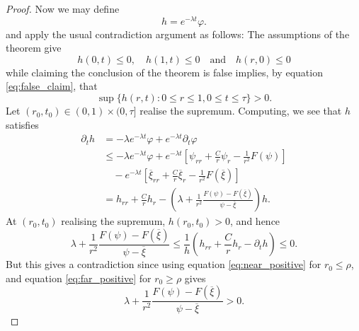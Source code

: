 \documentclass{amsart}
\begin{document}
\begin{proof}
Now we may define
\[
h = e^{-\lambda t} \varphi.
\]
and apply the usual contradiction argument as follows: The assumptions of the theorem give
\[
h(0, t) \leq 0, \quad h(1, t) \leq 0 \quad \text{and} \quad h(r, 0) \leq 0
\]
while claiming the conclusion of the theorem is false implies, by equation \eqref{eq:false_claim}, that
\[
\sup \{h(r, t) : 0 \leq r \leq 1, 0 \leq t \leq \tau\} > 0.
\]
Let \((r_0, t_0) \in (0, 1) \times (0, \tau]\) realise the supremum. Computing, we see that \(h\) satisfies
\[
\begin{split}
\partial_t h &= - \lambda e^{-\lambda t} \varphi + e^{-\lambda t} \partial_t \varphi \\
&\leq  -\lambda e^{-\lambda t} \varphi + e^{-\lambda t} \left[\psi_{rr} + \frac{C}{r} \psi_r - \frac{1}{r^2} F(\psi)\right] \\
&\quad - e^{-\lambda t}\left[\overline{\xi}_{rr} + \frac{C}{r} \overline{\xi}_r - \frac{1}{r^2} F(\overline{\xi})\right] \\
&= h_{rr} + \frac{C}{r} h_r - \left(\lambda + \frac{1}{r^2} \frac{F(\psi) - F(\overline{\xi})}{\psi - \overline{\xi}}\right) h.
\end{split}
\]
At \((r_0, t_0)\) realising the supremum, \(h(r_0, t_0) > 0\), and hence
\[
\lambda + \frac{1}{r^2} \frac{F(\psi) - F(\overline{\xi})}{\psi - \overline{\xi}} \leq \frac{1}{h} \left(h_{rr} + \frac{C}{r} h_r - \partial_t h\right) \leq 0.
\]
But this gives a contradiction since using equation \eqref{eq:near_positive} for \(r_0 \leq \rho\), and equation \eqref{eq:far_positive} for \(r_0 \geq \rho\) gives
\[
\lambda + \frac{1}{r^2} \frac{F(\psi) - F(\overline{\xi})}{\psi - \overline{\xi}} > 0.
\]
\end{proof}
\end{document}

